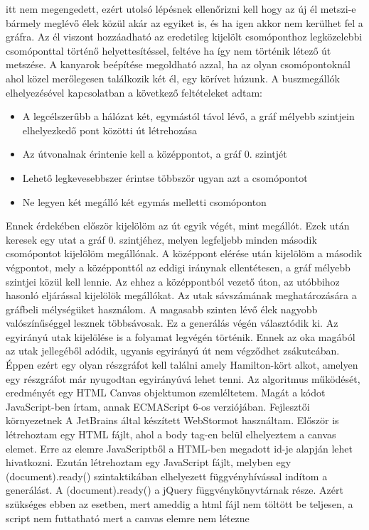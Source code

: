 itt nem megengedett, ezért utolsó lépésnek ellenőrizni kell hogy az új él metszi-e bármely meglévő élek közül akár az egyiket is, és ha igen akkor nem kerülhet fel a gráfra. Az él viszont hozzáadható 
az eredetileg kijelölt csomóponthoz legközelebbi csomóponttal történő helyettesítéssel, feltéve ha így nem történik létező út metszése.
A kanyarok beépítése megoldható azzal, ha az olyan csomópontoknál ahol közel merőlegesen találkozik két él, egy körívet húzunk. A buszmegállók elhelyezésével kapcsolatban a következő feltételeket
adtam:
\begin{itemize}
\item A legcélszerűbb a hálózat két, egymástól távol lévő, a gráf mélyebb szintjein elhelyezkedő pont közötti út létrehozása
\item Az útvonalnak érintenie kell a középpontot, a gráf 0. szintjét
\item Lehető legkevesebbszer érintse többször ugyan azt a csomópontot
\item Ne legyen két megálló két egymás melletti csomóponton
\end{itemize}
Ennek érdekében először kijelölöm az út egyik végét, mint megállót. Ezek után keresek egy utat a gráf 0. szintjéhez, melyen legfeljebb minden második csomópontot kijelölöm megállónak. A középpont 
elérése után kijelölöm a második végpontot, mely a középponttól az eddigi iránynak ellentétesen, a gráf mélyebb szintjei közül kell lennie. Az ehhez a középpontból vezető úton, az utóbbihoz hasonló 
eljárással kijelölök megállókat. Az utak sávszámának meghatározására a gráfbeli mélységüket használom. A magasabb szinten lévő élek nagyobb valószínűséggel lesznek többsávosak. Ez a generálás végén választódik
ki. Az egyirányú utak kijelölése is a folyamat legvégén történik. Ennek az oka magából az utak jellegéből adódik, ugyanis egyirányú út nem végződhet zsákutcában. Éppen ezért egy olyan részgráfot kell találni amely Hamilton-kört 
alkot, amelyen egy részgráfot már nyugodtan egyirányúvá lehet tenni.
Az algoritmus működését, eredményét egy HTML Canvas objektumon szemléltetem. Magát a kódot JavaScript-ben írtam, annak ECMAScript 6-os verziójában. Fejlesztői környezetnek A JetBrains által készített WebStormot használtam. Először is 
létrehoztam egy HTML fájlt, ahol a body tag-en belül elhelyeztem a canvas elemet. Erre az elemre JavaScriptből a HTML-ben megadott id-je alapján lehet hivatkozni. Ezután létrehoztam egy JavaScript fájlt, melyben egy (document).ready() szintaktikában 
elhelyezett függvényhívással indítom a generálást. A (document).ready() a jQuery függvénykönyvtárnak része. Azért szükséges ebben az esetben, mert ameddig a html fájl nem töltött be teljesen, a script nem futtatható mert a canvas elemre nem létezne 
